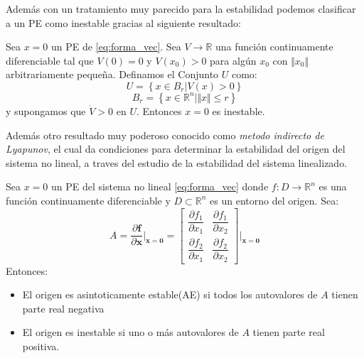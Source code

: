 \documentclass[10pt]{article}
\begin{document}
Además con un tratamiento muy parecido para la estabilidad podemos clasificar a un PE como inestable gracias al 
siguiente resultado:

\begin{teo}[Chetaev]
    Sea $x=0$ un PE de \eqref{eq:forma_vec}. Sea $V \rightarrow \mathbb{R} $ una función continuamente diferenciable
    tal que $V(0)=0$ y $V(x_{0})>0$ para algún $x_{0}$ con $\Vert x_{0} \Vert$ arbitrariamente pequeña. Definamos el 
    Conjunto $U$ como:
    \begin{equation}
        U = \left\{x \in B_{r} | V(x) > 0 \right\}
    \end{equation}
    \begin{equation}
        B_{r} = \left\{ x \in \mathbb{R}^{n}|\Vert x \Vert \leq r \right\}
    \end{equation}
    y supongamos que $\dot{V} > 0 $ en $U$. Entonces $x=0$ es inestable.
    \label{Chetaev}
\end{teo}
Además otro resultado muy poderoso conocido como \textit{metodo indirecto de Lyapunov}, el cual da condiciones 
para determinar la estabilidad del origen del sistema no lineal, a traves del estudio de la estabilidad del sistema linealizado.

\begin{teo}
    Sea $x=0$ un PE del sistema no lineal \eqref{eq:forma_vec} donde $f:D \rightarrow \mathbb{R}^{n}$ es una función continuamente
    diferenciable y $D \subset \mathbb{R}^{n}$ es un entorno del origen. Sea:
     \begin{equation}
        A=\dfrac{\partial \mathbf{f}}{\partial \mathbf{x}}\bigg\vert_{\mathbf{x}=\mathbf{0}}=
        \begin{bmatrix}
            \dfrac{\partial f_1}{\partial x_1}& \dfrac{\partial f_1}{\partial x_2} \\ 
            \dfrac{\partial f_2}{\partial x_1}& \dfrac{\partial f_2}{\partial x_2}
        \end{bmatrix} 
        \bigg\vert_{\mathbf{x}=\mathbf{0}}
    \label{eq:jaco2}
    \end{equation}
    Entonces:
    \begin{itemize}
            \item El origen es asintoticamente estable(AE) si todos los autovalores de $A$ tienen parte real negativa
            \item El origen es inestable si uno o más autovalores de $A$ tienen parte real positiva.
    \end{itemize}
\label{lyapunov_indirecto}
\end{teo}
\end{document}
